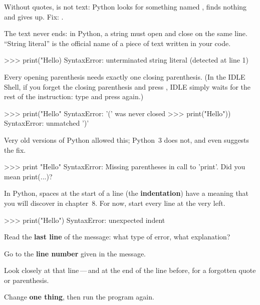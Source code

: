 Without quotes,  is not text: Python looks for something named , finds nothing
and gives up. Fix: .

The text never ends: in Python, a string must open and close on the same line. \enquote{String
literal} is the official name of a piece of text written in your code.
\begin{console}
>>> print("Hello)
SyntaxError: unterminated string literal (detected at line 1)
\end{console}

Every opening parenthesis needs exactly one closing parenthesis. (In the IDLE Shell, if you forget
the closing parenthesis and press , IDLE simply waits for the rest of the instruction:
type \py{)} and press  again.)
\begin{console}
>>> print("Hello"
SyntaxError: '(' was never closed
>>> print("Hello"))
SyntaxError: unmatched ')'
\end{console}

Very old versions of Python allowed this; Python~3 does not, and even suggests the fix.
\begin{console}
>>> print "Hello"
SyntaxError: Missing parentheses in call to 'print'. Did you mean print(...)?
\end{console}

In Python, spaces at the start of a line (the \textbf{indentation}) have a meaning that you will
discover in chapter~8. For now, start every line at the very left.
\begin{console}
>>>  print("Hello")
SyntaxError: unexpected indent
\end{console}

\begin{pratique}
\begin{etapes}
\item Read the \textbf{last line} of the message: what type of error, what explanation?
\item Go to the \textbf{line number} given in the message.
\item Look closely at that line\,---\,and at the end of the line before, for a forgotten quote or
  parenthesis.
\item Change \textbf{one thing}, then run the program again.
\end{etapes}
\end{pratique}

